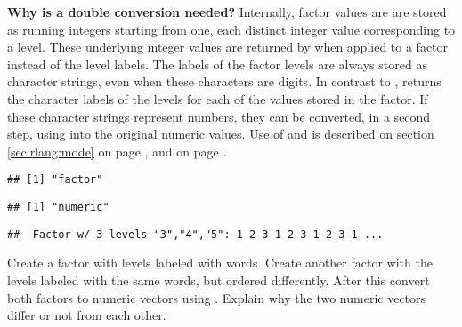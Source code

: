\documentclass[krantz2]{krantz}\usepackage{knitr}
\begin{document}
\begin{explainbox}
\textbf{Why is a double conversion needed?} Internally, factor values are  are stored as running integers starting from one, each distinct integer value corresponding to a level. These underlying integer values are returned by  when applied to a factor instead of the level labels. The labels of the factor levels are always stored as character strings, even when these characters are digits. In contrast to ,  returns the character labels of the levels for each of the values stored in the factor. If these character strings represent numbers, they can be converted, in a second step, using  into the original numeric values. Use of  and  is described on section \ref{sec:rlang:mode} on page \pageref{sec:rlang:mode}, and  on page \pageref{par:calc:str}.

\begin{knitrout}\footnotesize
{}\color{fgcolor}\begin{kframe}
\begin{alltt}
\end{alltt}
\begin{verbatim}
## [1] "factor"
\end{verbatim}
\begin{alltt}
\end{alltt}
\begin{verbatim}
## [1] "numeric"
\end{verbatim}
\begin{alltt}
\end{alltt}
\begin{verbatim}
##  Factor w/ 3 levels "3","4","5": 1 2 3 1 2 3 1 2 3 1 ...
\end{verbatim}
\end{kframe}
\end{knitrout}

\end{explainbox}

\begin{playground}
Create a factor with levels labeled with words. Create another factor with the levels labeled with the same words, but ordered differently. After this convert both factors to numeric vectors using . Explain why the two numeric vectors differ or not from each other.
\end{playground}
\end{document}
